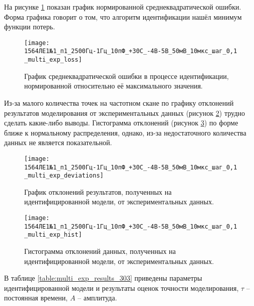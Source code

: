 	На рисунке \ref{pic:multi_exp_loss_303} показан график нормированной 
	среднеквадратической ошибки. Форма графика говорит о том, что алгоритм
	идентификации нашёл минимум функции потерь.

	\begin{figure}[!htp]
		\centering
		\texttt{[image: 1564ЛЕ1№1\_п1\_2500Гц-1Гц\_10пФ\_+30С\_-4В-5В\_50мВ\_10мкс\_шаг\_0,1\_multi\_exp\_loss]}
		\caption{График среднеквадратической ошибки в процессе идентификации,
		         нормированной относительно её максимального значения.}
		\label{pic:multi_exp_loss_303}
	\end{figure}

	Из-за малого количества точек на частотном скане по графику отклонений
	результатов моделирования от экспериментальных данных (рисунок 
	\ref{pic:multi_exp_deviations_303}) трудно сделать какие-либо выводы.
	Гистограмма отклонений (рисунок \ref{pic:multi_exp_hist_303}) по форме ближе 
	к нормальному распределения, однако, из-за недостаточного количества данных
	не является показательной.

	\begin{figure}[!htp]
		\centering
		\texttt{[image: 1564ЛЕ1№1\_п1\_2500Гц-1Гц\_10пФ\_+30С\_-4В-5В\_50мВ\_10мкс\_шаг\_0,1\_multi\_exp\_deviations]}
		\caption{График отклонений результатов, полученных на идентифицированной
		модели, от экспериментальных данных.}
		\label{pic:multi_exp_deviations_303}
	\end{figure}

	\begin{figure}[!htp]
		\centering
		\texttt{[image: 1564ЛЕ1№1\_п1\_2500Гц-1Гц\_10пФ\_+30С\_-4В-5В\_50мВ\_10мкс\_шаг\_0,1\_multi\_exp\_hist]}
		\caption{Гистограмма отклонений данных, полученных на идентифицированной 
		         модели, от экспериментальных данных.}
		\label{pic:multi_exp_hist_303}
	\end{figure}

	В таблице \ref{table:multi_exp_results_303} приведены параметры 
	идентифицированной модели и результаты оценок точности моделирования,  
	$\tau$ -- постоянная времени, $A$ -- амплитуда.

